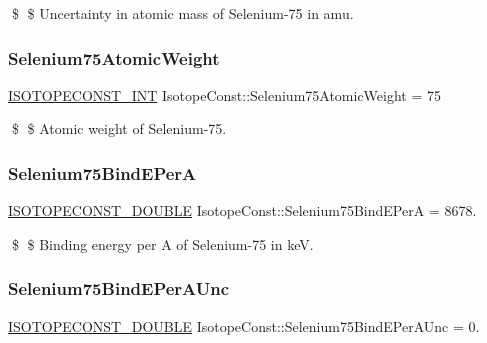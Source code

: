 \$ \$ Uncertainty in atomic mass of Selenium-\/75 in amu. \mbox{\label{group___isotope_const-_selenium-_se75_ga4b5f6c17071e4bca7ecf59ed4d6e69d7}} 
\subsubsection{\texorpdfstring{Selenium75\+Atomic\+Weight}{Selenium75AtomicWeight}}
{\footnotesize\ttfamily \mbox{\hyperlink{group___isotope_const-_macros_ga5f18360b3e99483a35c32d789e62621c}{I\+S\+O\+T\+O\+P\+E\+C\+O\+N\+S\+T\+\_\+\+I\+NT}} Isotope\+Const\+::\+Selenium75\+Atomic\+Weight = 75}

\$ \$ Atomic weight of Selenium-\/75. \mbox{\label{group___isotope_const-_selenium-_se75_gac2cf40959fe4bfaf3096fbfb304eaa9b}} 
\subsubsection{\texorpdfstring{Selenium75\+Bind\+E\+PerA}{Selenium75BindEPerA}}
{\footnotesize\ttfamily \mbox{\hyperlink{group___isotope_const-_macros_ga8f45a7272ce02c0b4c65c44636ed719a}{I\+S\+O\+T\+O\+P\+E\+C\+O\+N\+S\+T\+\_\+\+D\+O\+U\+B\+LE}} Isotope\+Const\+::\+Selenium75\+Bind\+E\+PerA = 8678.}

\$ \$ Binding energy per A of Selenium-\/75 in keV. \mbox{\label{group___isotope_const-_selenium-_se75_gab984f70e4ffd59ad4663ddb0ba586c9f}} 
\subsubsection{\texorpdfstring{Selenium75\+Bind\+E\+Per\+A\+Unc}{Selenium75BindEPerAUnc}}
{\footnotesize\ttfamily \mbox{\hyperlink{group___isotope_const-_macros_ga8f45a7272ce02c0b4c65c44636ed719a}{I\+S\+O\+T\+O\+P\+E\+C\+O\+N\+S\+T\+\_\+\+D\+O\+U\+B\+LE}} Isotope\+Const\+::\+Selenium75\+Bind\+E\+Per\+A\+Unc = 0.}


